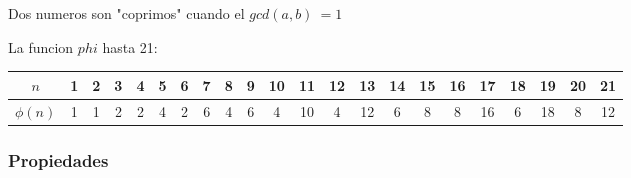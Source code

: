 \documentclass[12pt]{article}
\begin{document}
Dos numeros son "coprimos" cuando el \(gcd(a, b)\ = 1\)

La funcion \(phi\) hasta 21:
\begin{center}
    \begin{tabular}{|c|c|c|c|c|c|c|c|c|c|c|c|c|c|c|c|c|c|c|c|c|c|}
    \hline
    $n$ & 1 & 2 & 3 & 4 & 5 & 6 & 7 & 8 & 9 & 10 & 11 & 12 & 13 & 14 & 15 & 16 & 17 & 18 & 19 & 20 & 21 \\
    \hline
    $\phi(n)$ & 1 & 1 & 2 & 2 & 4 & 2 & 6 & 4 & 6 & 4 & 10 & 4 & 12 & 6 & 8 & 8 & 16 & 6 & 18 & 8 & 12 \\
    \hline
    \end{tabular}
\end{center}

\subsubsection{Propiedades}
\end{document}
